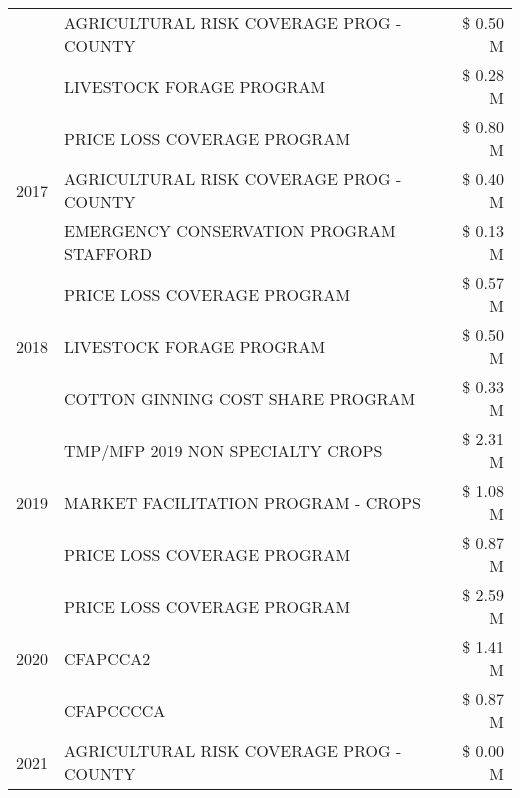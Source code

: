 \begin{tabular}{llr}
 & AGRICULTURAL RISK COVERAGE PROG - COUNTY & \$ 0.50 M \\
 & LIVESTOCK FORAGE PROGRAM & \$ 0.28 M \\
\cline{1-3}
\multirow[t]{3}{*}{2017} & PRICE LOSS COVERAGE PROGRAM & \$ 0.80 M \\
 & AGRICULTURAL RISK COVERAGE PROG - COUNTY & \$ 0.40 M \\
 & EMERGENCY CONSERVATION PROGRAM STAFFORD & \$ 0.13 M \\
\cline{1-3}
\multirow[t]{3}{*}{2018} & PRICE LOSS COVERAGE PROGRAM & \$ 0.57 M \\
 & LIVESTOCK FORAGE PROGRAM & \$ 0.50 M \\
 & COTTON GINNING COST SHARE PROGRAM & \$ 0.33 M \\
\cline{1-3}
\multirow[t]{3}{*}{2019} & TMP/MFP 2019 NON SPECIALTY CROPS & \$ 2.31 M \\
 & MARKET FACILITATION PROGRAM - CROPS & \$ 1.08 M \\
 & PRICE LOSS COVERAGE PROGRAM & \$ 0.87 M \\
\cline{1-3}
\multirow[t]{3}{*}{2020} & PRICE LOSS COVERAGE PROGRAM & \$ 2.59 M \\
 & CFAPCCA2 & \$ 1.41 M \\
 & CFAPCCCCA & \$ 0.87 M \\
\cline{1-3}
2021 & AGRICULTURAL RISK COVERAGE PROG - COUNTY & \$ 0.00 M \\
\cline{1-3}
\bottomrule
\end{tabular}
